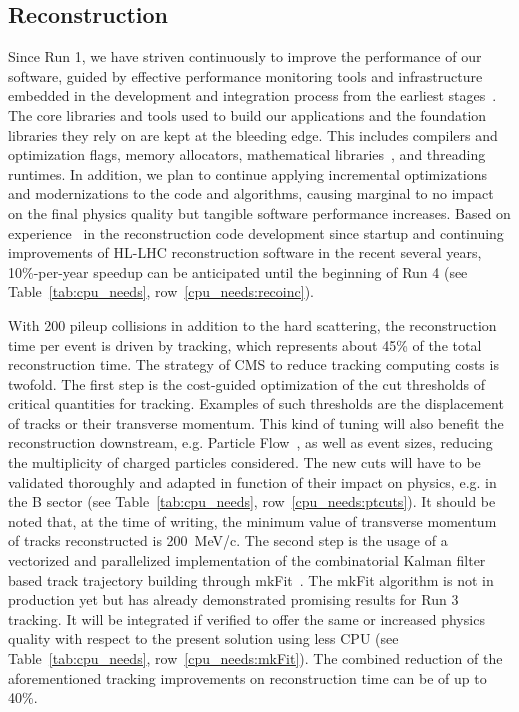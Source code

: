 \documentclass{cmspaper}
\begin{document}
\subsection{Reconstruction}
Since Run 1, we have striven continuously to improve the performance of our software, guided by effective  performance monitoring tools and infrastructure embedded in the development and integration process from the earliest stages~\cite{Eulisse_2010, 4774926}.
The core libraries and tools used to build our applications and the foundation libraries they rely on are kept at the bleeding edge. This includes compilers and optimization flags, memory allocators, mathematical libraries~\cite{2025717}, and threading runtimes. In addition, we plan to continue applying incremental optimizations and modernizations to the code and algorithms, causing marginal to no impact on the final physics quality but tangible software performance increases. 
Based on experience~\cite{Reco:Chep2018} in the reconstruction code development since startup and continuing improvements of HL-LHC reconstruction software in the recent several years, 10\%-per-year speedup can be anticipated until the beginning of Run 4 (see Table~\ref{tab:cpu_needs}, row~\ref{cpu_needs:recoinc}).

With 200 pileup collisions in addition to the hard scattering, the reconstruction time per event is driven by tracking, which represents about 45\% of the total reconstruction time. The strategy of CMS to reduce tracking computing costs is twofold. The first step is the cost-guided optimization of the cut thresholds of critical quantities for tracking. Examples of such thresholds are the displacement of tracks or their transverse momentum. This kind of tuning will also benefit the reconstruction downstream, e.g. Particle Flow~\cite{Sirunyan_2017}, as well as event sizes, reducing the multiplicity of charged particles considered. The new cuts will have to be validated thoroughly and adapted in function of their impact on physics, e.g. in the B sector (see Table~\ref{tab:cpu_needs}, row~\ref{cpu_needs:ptcuts}). It should be noted that, at the time of writing, the minimum value of transverse momentum of tracks reconstructed is 200~MeV/c.
The second step is the usage of a vectorized and parallelized implementation of the combinatorial Kalman filter based track trajectory building through mkFit~\cite{Lantz_2020}. The mkFit algorithm is not in production yet but has already demonstrated promising results for Run 3 tracking. It will be integrated if verified to offer the same or increased physics quality with respect to the present solution using less CPU (see Table~\ref{tab:cpu_needs}, row~\ref{cpu_needs:mkFit}). The combined reduction of the aforementioned tracking improvements on reconstruction time can be of up to 40\%.
\end{document}
